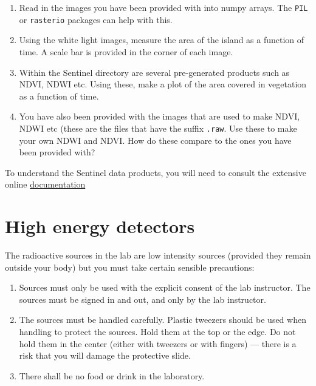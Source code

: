 \documentclass{tufte-book}
\begin{document}
\begin{tcolorbox}[sharp corners=all, colback=white!75!green, title=Exercises]

\begin{enumerate}
  \item Read in the images you have been provided with into numpy arrays. The \texttt{PIL} or \texttt{rasterio} packages can help with this.
    \item Using the white light images, measure the area of the island as a function of time. A scale bar is provided in the corner of each image.
    \item Within the Sentinel directory are several pre-generated products such as NDVI, NDWI etc. Using these, make a plot of the area covered in vegetation as a function of time.
    \item You have also been provided with the images that are used to make NDVI, NDWI etc (these are the files that have the suffix \texttt{.raw}. Use these to make your own NDWI and NDVI. How do these compare to the ones you have been provided with?
\end{enumerate}



\end{tcolorbox} 



To understand the Sentinel data products, you will need to consult the extensive online \href{https://documentation.dataspace.copernicus.eu/Data/SentinelMissions/Sentinel2.html}{documentation}

\chapter{High energy detectors}

\begin{tcolorbox}[colback=red!5,colframe=red!75!black,title=\textbf{Important
      --- Radiation Safety}] 
The radioactive sources in the lab are low intensity sources (provided they remain outside your body) but you must take certain sensible precautions: 
\begin{enumerate}
\item Sources must only be used with the explicit consent of the lab instructor. 
The sources must be signed in and out, and only by the lab instructor. 
\item The sources must be handled carefully. Plastic tweezers should be used
  when handling to protect the sources. Hold them at the top or the edge. Do
  not hold them in the center (either with tweezers or with fingers) --- there
  is a risk that you will damage the protective slide. 
\item There shall be no food or drink in the laboratory. 
\end{enumerate}
\end{tcolorbox} 
\end{document}
